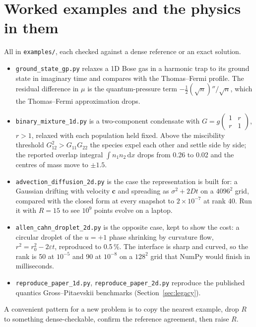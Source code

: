 \documentclass[11pt,a4paper]{article}
\newcommand{\code}[1]{\texttt{#1}}
\newcommand{\dd}{\mathrm{d}}
\begin{document}
\section{Worked examples and the physics in them}
\label{sec:examples}

All in \code{examples/}, each checked against a dense reference or an exact solution.
\begin{itemize}[leftmargin=1.5em]
\item \code{ground\_state\_gp.py} relaxes a 1D Bose gas in a harmonic trap to its
  ground state in imaginary time and compares with the Thomas--Fermi profile. The
  residual difference in $\mu$ is the quantum-pressure term
  $-\tfrac12(\sqrt n)''/\sqrt n$, which the Thomas--Fermi approximation drops.
\item \code{binary\_mixture\_1d.py} is a two-component condensate with
  $G=g\left(\begin{smallmatrix}1&r\\r&1\end{smallmatrix}\right)$, $r>1$, relaxed with
  each population held fixed. Above the miscibility threshold $G_{12}^2>G_{11}G_{22}$
  the species expel each other and settle side by side; the reported overlap integral
  $\int n_1n_2\,\dd x$ drops from 0.26 to 0.02 and the centres of mass move to $\pm1.5$.
\item \code{advection\_diffusion\_2d.py} is the case the representation is built for:
  a Gaussian drifting with velocity $\mathbf c$ and spreading as $\sigma^2+2Dt$ on a
  $4096^2$ grid, compared with the closed form at every snapshot to $2\times10^{-7}$ at
  rank 40. Run it with $R=15$ to see $10^9$ points evolve on a laptop.
\item \code{allen\_cahn\_droplet\_2d.py} is the opposite case, kept to show the cost: a
  circular droplet of the $u=+1$ phase shrinking by curvature flow,
  $r^2=r_0^2-2\varepsilon t$, reproduced to 0.5\,\%. The interface is sharp and curved,
  so the rank is 50 at $10^{-5}$ and 90 at $10^{-8}$ on a $128^2$ grid that NumPy would
  finish in milliseconds.
\item \code{reproduce\_paper\_1d.py}, \code{reproduce\_paper\_2d.py} reproduce the
  published quantics Gross--Pitaevskii benchmarks (Section~\ref{sec:legacy}).
\end{itemize}
A convenient pattern for a new problem is to copy the nearest example, drop $R$ to
something dense-checkable, confirm the reference agreement, then raise $R$.
\end{document}
